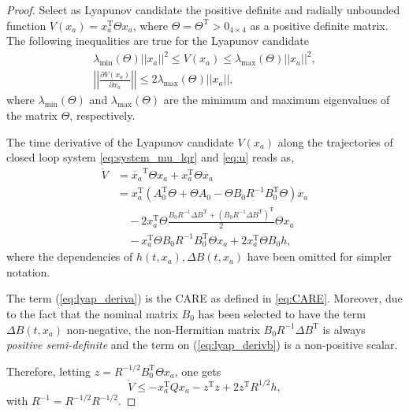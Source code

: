 \documentclass[journal,twoside,web]{ieeecolor}
\begin{document}
\begin{proof}
Select as Lyapunov candidate the positive definite and radially unbounded function $\displaystyle V(x_a)=x_a^{\mathrm{T}} \Theta x_a$, where $\displaystyle \Theta=\Theta^{\mathrm{T}}>0_{4\times 4}$ as a positive definite matrix. The following inequalities are true for the Lyapunov candidate
\begin{align}
\displaystyle
\lambda_{\text{min}}(\Theta)||x_a||^2 \leq V(x_a) \leq \lambda_{\text{max}}(\Theta)||x_a||^2, \\
\left|\left| \frac{\partial V(x_a)}{\partial x_a} \right| \right| \leq 2 \lambda_{\text{max}}(\Theta) ||x_a||,
\label{eq:lyap_ineq}
\end{align}
where $\lambda_{\text{min}}(\Theta)$ and $\lambda_{\text{max}}(\Theta)$ are the minimum and maximum eigenvalues of the matrix $\Theta$, respectively. 

The time derivative of the Lyapunov candidate $\displaystyle V(x_a)$ along the trajectories of closed loop system \eqref{eq:system_mu_lqr} and \eqref{eq:u} reads as,
\begin{subequations}
\begin{align}
\displaystyle
\dot{V} &=\dot{x_a}^{\mathrm{T}} \Theta x_a + x_a^{\mathrm{T}} \Theta \dot{x_a} \nonumber \\
&= x_a^{\mathrm{T}} \left(A^{\mathrm{T}}_0 \Theta + \Theta A_0 -\Theta B_0 R^{-1} B^{\mathrm{T}}_0 \Theta \right) x_a  \label{eq:lyap_deriva} \\
& \quad - 2 x_a^{\mathrm{T}} \Theta \frac{B_0 R^{-1} \Delta B^{\mathrm{T}} + \left(B_0 R^{-1} \Delta B^{\mathrm{T}}\right)^{\mathrm{T}}}{2} \Theta x_a  \label{eq:lyap_derivb} \\
& \quad -x_a^{\mathrm{T}}\Theta B_0 R^{-1} B^{\mathrm{T}}_0 \Theta x_a + 2x_a^{\mathrm{T}} \Theta B_0 h,
\end{align}
\label{eq:lyap_deriv}\end{subequations}
where the dependencies of $h(t,x_a),\Delta B(t,x_a)$ have been omitted for simpler notation.

The term (\ref{eq:lyap_deriva}) is the CARE as defined in \eqref{eq:CARE}. Moreover, due to the fact that the nominal matrix $\displaystyle B_0$ has been selected to have the term $\Delta B(t,x_a)$ non-negative, the non-Hermitian matrix $\displaystyle B_0 R^{-1} \Delta B^{\mathrm{T}}$ is always \textit{positive semi-definite} and the term on (\ref{eq:lyap_derivb}) is a non-positive scalar. 

Therefore, letting $\displaystyle z=R^{-1/2} B^{\mathrm{T}}_0 \Theta x_a$, one gets
\begin{equation}
\displaystyle
\dot{V} \leq - x_a^{\mathrm{T}} Q x_a - z^{\mathrm{T}}  z + 2 z^{\mathrm{T}} R^{1/2} h,
\label{eq:lyap_deriv2}
\end{equation}
with $\displaystyle R^{-1}=R^{-1/2}R^{-1/2}$. 


\end{proof}
\end{document}
